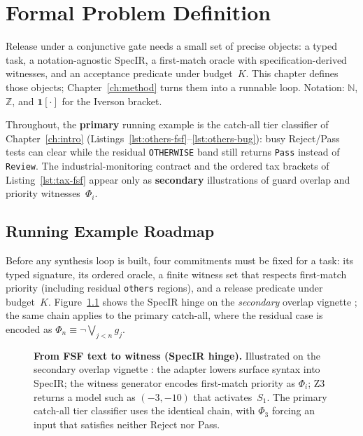 \chapter{Formal Problem Definition}
\label{ch:formalization}

Release under a conjunctive gate needs a small set of precise objects:
a typed task, a notation-agnostic SpecIR, a first-match oracle with
specification-derived witnesses, and an acceptance predicate under budget~$K$.
This chapter defines those objects; Chapter~\ref{ch:method} turns them into a
runnable loop.
Notation: $\mathbb{N}$, $\mathbb{Z}$, and $\mathbf{1}[\cdot]$ for the Iverson
bracket.

Throughout, the \textbf{primary} running example is the catch-all tier
classifier of Chapter~\ref{ch:intro}
(Listings~\ref{lst:others-fsf}--\ref{lst:others-bug}): busy Reject/Pass tests
can clear while the residual \texttt{OTHERWISE} band still returns
\texttt{Pass} instead of \texttt{Review}.
The industrial-monitoring contract  and the ordered tax
brackets of Listing~\ref{lst:tax-fsf} appear only as \textbf{secondary}
illustrations of guard overlap and priority witnesses~$\Phi_i$.

\section{Running Example Roadmap}
\label{sec:form:roadmap}

Before any synthesis loop is built, four commitments must be fixed for a
task: its typed signature, its ordered oracle, a finite witness set that
respects first-match priority (including residual \texttt{others} regions),
and a release predicate under budget~$K$.
Figure~\ref{fig:specir-walkthrough} shows the SpecIR hinge on the
\emph{secondary} overlap vignette ; the same chain
applies to the primary catch-all, where the residual case is encoded as
$\Phi_n \equiv \neg\bigvee_{j<n} g_j$.

\begin{figure}[t]
  \centering
  \caption{\textbf{From FSF text to witness (SpecIR hinge).}
    Illustrated on the secondary overlap vignette :
    the adapter lowers surface syntax into SpecIR; the witness generator
    encodes first-match priority as $\Phi_i$; Z3 returns a model such as
    $(-3,-10)$ that activates~$S_1$.
    The primary catch-all tier classifier uses the identical chain, with
    $\Phi_3$ forcing an input that satisfies neither Reject nor Pass.}
  \label{fig:specir-walkthrough}
\end{figure}

